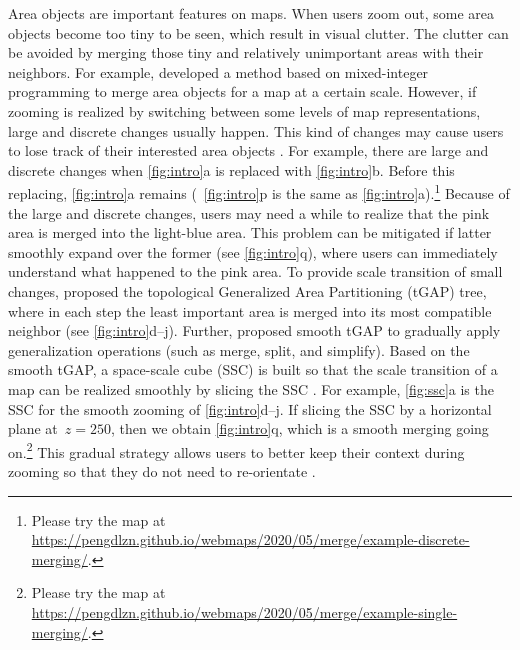 \documentclass[]{interact}
\begin{document}
Area objects are important features on maps. 
When users zoom out,
some area objects become too tiny to be seen,
which result in visual clutter.
The clutter can be avoided by merging 
those tiny and relatively unimportant areas with their neighbors.
For example, \citet{haunert2008f} developed a method based on
mixed-integer programming to merge area objects
for a map at a certain scale.
However, if zooming is realized by switching between
some levels of map representations, 
large and discrete changes usually happen.
This kind of changes may cause users to lose track of
their interested area objects \citep{vanKreveld2001}.
For example, there are large and discrete changes when
\fig\ref{fig:intro}a is replaced with \fig\ref{fig:intro}b.
Before this replacing, \fig\ref{fig:intro}a remains
(\eg~\fig\ref{fig:intro}p is the same as \fig\ref{fig:intro}a).\footnote{%
Please try the map at
\url{https://pengdlzn.github.io/webmaps/2020/05/merge/example-discrete-merging/}.}
Because of the large and discrete changes,
users may need a while to realize that 
the pink area is merged into the light-blue area.
This problem can be mitigated if latter smoothly expand over the former
(see \fig\ref{fig:intro}q), where users can immediately understand 
what happened to the pink area. 
To provide scale transition of small changes, 
\citet{vanOosterom2005} proposed 
the topological Generalized Area Partitioning (tGAP) tree,
where in each step the least important area is merged into
its most compatible neighbor 
(see \figs\ref{fig:intro}d--j).
Further, \citet{vanOosterom2014Support} proposed smooth tGAP
to gradually apply generalization operations 
(such as merge, split, and simplify).
Based on the smooth tGAP, a space-scale cube (SSC) is built so that 
the scale transition of a map can be realized smoothly
by slicing the SSC \citep[see][]{Meijers2020Web}.
For example, \fig\ref{fig:ssc}a is the SSC 
for the smooth zooming of \figs\ref{fig:intro}d--j.
If slicing the SSC by a horizontal plane at~$z=250$,
then we obtain \fig\ref{fig:intro}q, 
which is a smooth merging going on.\footnote{%
Please try the map at
\url{https://pengdlzn.github.io/webmaps/2020/05/merge/example-single-merging/}.}
This gradual strategy allows users 
to better keep their context during zooming
so that they do not need to re-orientate
\citep{Noellenburg2008}.
\end{document}
